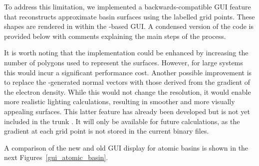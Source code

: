 \newpage
To address this limitation, we implemented a backwards-compatible
\gls{GUI} feature that reconstructs approximate basin surfaces using the
labelled grid points. These shapes are rendered in
\vtk within the \tcl-based \gls{GUI}. A condensed version of the \tcl code is
provided below with comments explaining the main steps of the process.



\newpage
It is worth noting that the implementation could be enhanced by increasing the
number of polygons used to represent the surfaces. However, for large systems
this would incur a significant performance cost. Another possible improvement
is to replace the \vtk-generated normal vectors with those derived from the
gradient of the electron density. While this would not change the resolution,
it would enable more realistic lighting calculations, resulting in smoother
and more visually appealing surfaces. This latter feature has already been
developed but is not yet included in the trunk \branch. It will only be
available for future \ams calculations, as the gradient at each grid point is
not stored in the current binary files.

A comparison of the new and old \gls{GUI} display for atomic basins is shown in
the next Figures~\ref{gui_atomic_basin}.


